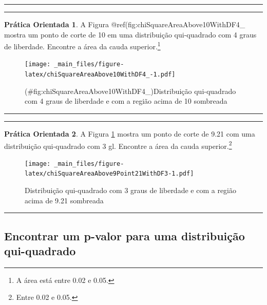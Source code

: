\documentclass[
]{book}
\theoremstyle{definition}
\theoremstyle{definition}
\theoremstyle{definition}
\newtheorem{exercise}{Prática Orientada}[chapter]
\theoremstyle{definition}
\theoremstyle{remark}
\begin{document}
\begin{center}\rule{0.5\linewidth}{0.5pt}\end{center}

\begin{center}\rule{0.5\linewidth}{0.5pt}\end{center}

\begin{exercise}
\protect\hypertarget{exr:unnamed-chunk-242}{}{\label{exr:unnamed-chunk-242} }A Figura @ref(fig:chiSquareAreaAbove10WithDF4\_ mostra um ponto de corte de 10 em uma distribuição qui-quadrado com 4 graus de liberdade. Encontre a área da cauda superior.\footnote{A área está entre 0.02 e 0.05.}
\end{exercise}

\begin{figure}
\centering
\texttt{[image: \_main\_files/figure-latex/chiSquareAreaAbove10WithDF4\_-1.pdf]}
\caption{(\#fig:chiSquareAreaAbove10WithDF4\_)Distribuição qui-quadrado com 4 graus de liberdade e com a região acima de 10 sombreada}
\end{figure}

\begin{center}\rule{0.5\linewidth}{0.5pt}\end{center}

\begin{center}\rule{0.5\linewidth}{0.5pt}\end{center}

\begin{exercise}
\protect\hypertarget{exr:unnamed-chunk-243}{}{\label{exr:unnamed-chunk-243} }A Figura \ref{fig:chiSquareAreaAbove9Point21WithDF3} mostra um ponto de corte de 9.21 com uma distribuição qui-quadrado com 3 gl. Encontre a área da cauda superior.\footnote{Entre 0.02 e 0.05.}
\end{exercise}

\begin{figure}
\centering
\texttt{[image: \_main\_files/figure-latex/chiSquareAreaAbove9Point21WithDF3-1.pdf]}
\caption{\label{fig:chiSquareAreaAbove9Point21WithDF3}Distribuição qui-quadrado com 3 graus de liberdade e com a região acima de 9.21 sombreada}
\end{figure}

\begin{center}\rule{0.5\linewidth}{0.5pt}\end{center}

\hypertarget{findPValueChiSquare}{%
\subsection{Encontrar um p-valor para uma distribuição qui-quadrado}\label{findPValueChiSquare}}
\end{document}
